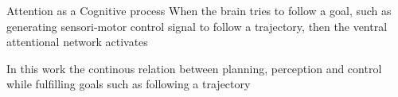 \begin{frame}{Attention as a Cognitive process}
    When the brain tries to follow a goal, such as generating sensori-motor control signal to follow a trajectory, then the ventral attentional network activates\cite{scalf-2014-trial-history-effects-in-the-ventral-attentional-network}
    
    In this work the continous relation between planning, perception and control while fulfilling goals such as following a trajectory
\end{frame}